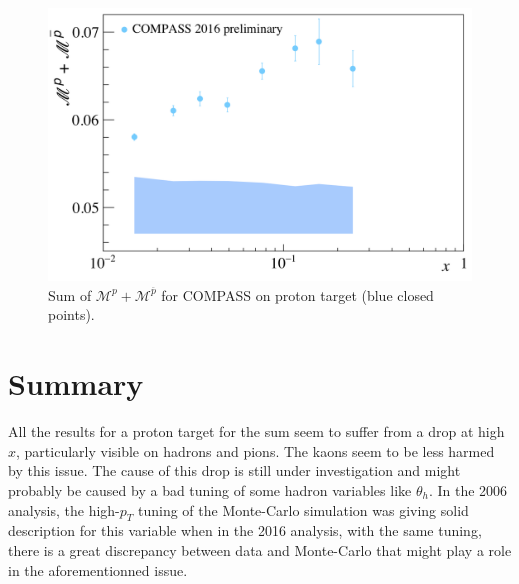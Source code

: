 \begin{figure}[!h]
  \centering
	\includegraphics[scale=0.5]{./gfx/ps.png}
	\caption{Sum of $\mathscr{M}^{p}+\mathscr{M}^{\overline{p}}$ for COMPASS on proton target (blue closed points).}
	\label{pic:psum}
\end{figure}

\section{Summary}

All the results for a proton target for the sum seem to suffer from a drop at high $x$, particularly visible on hadrons and pions. The kaons seem to be less harmed by this issue. The cause of this drop is still under investigation and might probably be caused by a bad tuning of some hadron variables like $\theta_h$. In the 2006 analysis, the high-$p_T$ tuning of the Monte-Carlo simulation was giving solid description for this variable when in the 2016 analysis, with the same tuning, there is a great discrepancy between data and Monte-Carlo that might play a role in the aforementionned issue.

